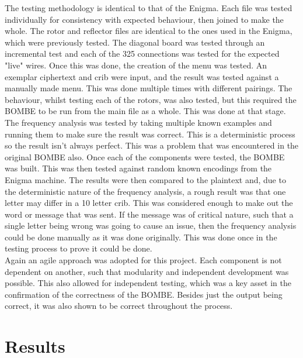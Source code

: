 \documentclass[12pt,a4paper]{article}
\begin{document}
The testing methodology is identical to that of the Enigma. Each file was tested individually for consistency with expected behaviour, then joined to make the whole. The rotor and reflector files are identical to the ones used in the Enigma, which were previously tested. The diagonal board was tested through an incremental test and each of the 325 connections was tested for the expected "live" wires. Once this was done, the creation of the menu was tested. An exemplar ciphertext and crib were input, and the result was tested against a manually made menu. This was done multiple times with different pairings. The behaviour, whilst testing each of the rotors, was also tested, but this required the BOMBE to be run from the main file as a whole. This was done at that stage. The frequency analysis was tested by taking multiple known examples and running them to make sure the result was correct. This is a deterministic process so the result isn't always perfect. This was a problem that was encountered in the original BOMBE also. Once each of the components were tested, the BOMBE was built. This was then tested against random known encodings from the Enigma machine. The results were then compared to the plaintext and, due to the deterministic nature of the frequency analysis, a rough result was that one letter may differ in a 10 letter crib. This was considered enough to make out the word or message that was sent. If the message was of critical nature, such that a single letter being wrong was going to cause an issue, then the frequency analysis could be done manually as it was done originally. This was done once in the testing process to prove it could be done.\\

Again an agile approach was adopted for this project. Each component is not dependent on another, such that modularity and independent development was possible. This also allowed for independent testing, which was a key asset in the confirmation of the correctness of the BOMBE. Besides just the output being correct, it was also shown to be correct throughout the process.

\section{Results}

\end{document}
